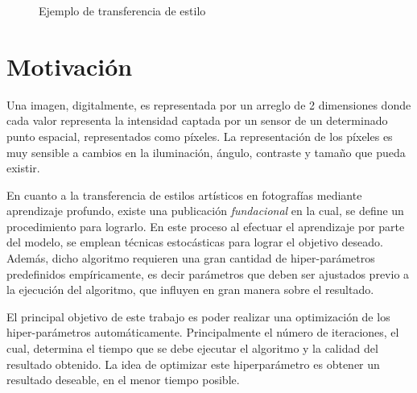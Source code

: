 \documentclass[a4paper,11pt,spanish]{book}
\begin{document}
\begin{figure}[h]
\begin{center}
	
      \end{center}
      \caption{Ejemplo de transferencia de estilo}
      \label{fig:style_transfer_candy_tower}
    \end{figure}
  
  \section {Motivación}
    Una imagen, digitalmente, es representada por un arreglo de 2 dimensiones donde cada valor representa la intensidad captada por un sensor
    de un determinado punto espacial, representados como píxeles. 
    La representación de los píxeles es muy sensible a cambios en la iluminación, ángulo, contraste y tamaño que pueda existir.

    En cuanto a la transferencia de estilos artísticos en fotografías mediante aprendizaje profundo, existe una publicación \emph{fundacional} \cite{Gatys:Neural_Style} 
    en la cual, se define un procedimiento para lograrlo. 
    En este proceso al efectuar el aprendizaje por parte del modelo, se emplean técnicas estocásticas para lograr el objetivo deseado. 
    Además, dicho algoritmo requieren una gran cantidad de hiper-parámetros predefinidos empíricamente, es decir parámetros que deben ser ajustados previo a la ejecución 
    del algoritmo, que influyen en gran manera sobre el resultado.

    El principal objetivo de este trabajo es poder realizar una optimización de los hiper-parámetros automáticamente. 
    Principalmente el número de iteraciones, el cual, determina el tiempo que se debe ejecutar el algoritmo y la calidad del resultado obtenido. 
    La idea de optimizar este hiperparámetro es obtener un resultado deseable, en el menor tiempo posible.
\end{document}
